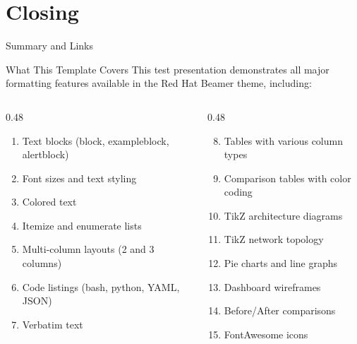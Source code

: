 \section{Closing}

\begin{frame}{Summary and Links}
  \begin{block}{What This Template Covers}
    \tiny
    This test presentation demonstrates all major formatting features available
    in the Red Hat Beamer theme, including:
  \end{block}

  \vspace{0.05cm}

  \tiny
  \begin{columns}[T]
    \begin{column}{0.48\textwidth}
      \begin{enumerate}
        \setlength{\itemsep}{0pt}
        \item Text blocks (block, exampleblock, alertblock)
        \item Font sizes and text styling
        \item Colored text
        \item Itemize and enumerate lists
        \item Multi-column layouts (2 and 3 columns)
        \item Code listings (bash, python, YAML, JSON)
        \item Verbatim text
      \end{enumerate}
    \end{column}
    \begin{column}{0.48\textwidth}
      \begin{enumerate}
        \setcounter{enumi}{7}
        \setlength{\itemsep}{0pt}
        \item Tables with various column types
        \item Comparison tables with color coding
        \item TikZ architecture diagrams
        \item TikZ network topology
        \item Pie charts and line graphs
        \item Dashboard wireframes
        \item Before/After comparisons
        \item FontAwesome icons
      \end{enumerate}
    \end{column}
  \end{columns}


\end{frame}
